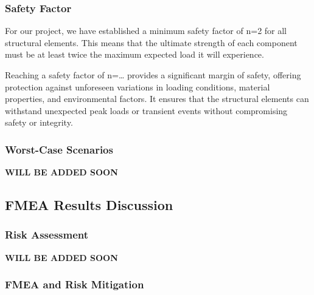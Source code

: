 \subsubsection{Safety Factor}

For our project, we have established a minimum safety factor of n=2 for all structural elements. This means that the ultimate strength of each component must be at least twice the maximum expected load it will experience.

Reaching a safety factor of n=… provides a significant margin of safety, offering protection against unforeseen variations in loading conditions, material properties, and environmental factors. It ensures that the structural elements can withstand unexpected peak loads or transient events without compromising safety or integrity.


\subsubsection{Worst-Case Scenarios}

\textbf{WILL BE ADDED SOON}




\subsection{FMEA Results Discussion}


\subsubsection{Risk Assessment}

\textbf{WILL BE ADDED SOON}


\subsubsection{FMEA and Risk Mitigation}

